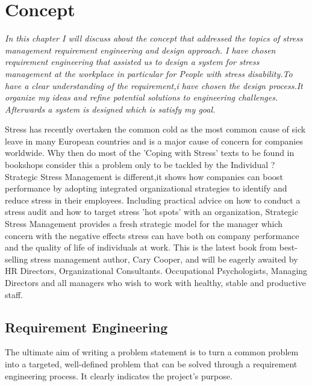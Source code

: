\chapter{Concept}
\textit{In this chapter I will discuss about the concept that addressed the topics  of  stress management requirement engineering and design approach. I have  chosen requirement engineering that  assisted  us  to design a system for stress management at  the  workplace  in  particular  for People with stress disability.To have  a clear understanding of the requirement,i have chosen the design process.It organize my ideas and refine potential solutions to engineering challenges. Afterwards  a  system is designed which is satisfy my goal.}
\vspace{5mm}

Stress has recently overtaken the common cold as the most common cause of sick leave in many European countries and is a major cause of concern for companies worldwide. Why then do most of the 'Coping with Stress' texts to be found in bookshops consider this a problem only to be tackled by the Individual ? Strategic Stress Management is different,it shows how companies can boost performance by adopting integrated organizational strategies to identify and reduce stress in their employees. Including practical advice on how to conduct a stress audit and how to target stress 'hot spots' with an organization, Strategic Stress Management provides a fresh strategic model for the manager which concern with the negative effects stress can have both on company performance and the quality of life of individuals at work. This is the latest book from best-selling stress management author, Cary Cooper, and will be eagerly awaited by HR Directors, Organizational Consultants. Occupational Psychologists, Managing Directors and all managers who wish to work with healthy, stable and productive staff.

\section{Requirement Engineering}
The ultimate aim of writing a problem statement is to turn a common problem into a targeted, well-defined problem that can be solved through a requirement engineering process. It clearly indicates the project's purpose. \citep{K.AduMichael2014InadequateStudy.}

\begin{figure}[ht!]
\centering
{}
  \label{fig:RE}
\end{figure}


